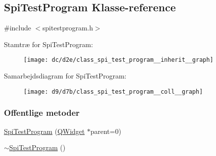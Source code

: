 \hypertarget{class_spi_test_program}{}\subsection{Spi\+Test\+Program Klasse-\/reference}
\label{class_spi_test_program}


{\ttfamily \#include $<$spitestprogram.\+h$>$}



Stamtræ for Spi\+Test\+Program\+:\nopagebreak
\begin{figure}[H]
\begin{center}
\leavevmode
\texttt{[image: dc/d2e/class\_spi\_test\_program\_\_inherit\_\_graph]}
\end{center}
\end{figure}


Samarbejdsdiagram for Spi\+Test\+Program\+:\nopagebreak
\begin{figure}[H]
\begin{center}
\leavevmode
\texttt{[image: d9/d7b/class\_spi\_test\_program\_\_coll\_\_graph]}
\end{center}
\end{figure}
\subsubsection*{Offentlige metoder}
\begin{DoxyCompactItemize}
\item 
\hyperlink{class_spi_test_program_aea7280e485f6a12d40676144c83044b7}{Spi\+Test\+Program} (\hyperlink{class_q_widget}{Q\+Widget} $\ast$parent=0)
\item 
\hyperlink{class_spi_test_program_aacfefd1f225cb5dfdade78a4fbee94bd}{$\sim$\+Spi\+Test\+Program} ()
\end{DoxyCompactItemize}
